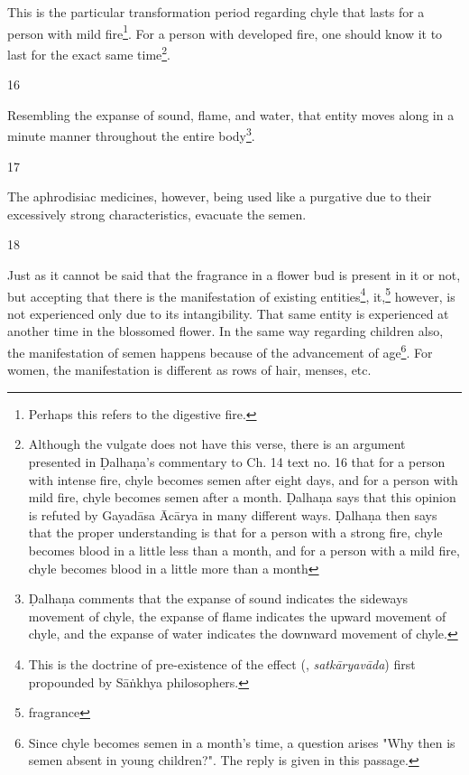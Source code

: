 \begin{translation}
\begin{sloka}
This is the particular transformation period regarding chyle that lasts for a person with mild fire\footnote{Perhaps this refers to the digestive fire.}. For a person with developed fire, one should know it to last for the exact same time\footnote{Although the vulgate does not have this verse, there is an argument presented in Ḍalhaṇa's commentary \citep[63]{vulgate} to Ch. 14 text no. 16 that for a person with intense fire, chyle becomes semen after eight days, and for a person with mild fire, chyle becomes semen after a month. Ḍalhaṇa says that this opinion is refuted by Gayadāsa Ācārya in many different ways. Ḍalhaṇa then says that the proper understanding is that for a person with a strong fire, chyle becomes blood in a little less than a month, and for a person with a mild fire, chyle becomes blood in a little more than a month}.



\end{sloka}

\item[16]

Resembling the expanse of sound, flame, and water, that entity moves along in a minute manner throughout the  entire body\footnote{Ḍalhaṇa comments \citep[63]{vulgate} that the expanse of sound indicates the sideways movement of chyle, the expanse of flame indicates the upward movement of chyle, and the expanse of water indicates the downward movement of chyle.}.

\item[17]

The aphrodisiac medicines, however, being used like a purgative due to their excessively strong characteristics, evacuate the semen.      

\item[18]

Just as it cannot be said that the fragrance in a flower bud is present in it or not, but 
accepting that there is the manifestation of existing entities\footnote{This is the 
doctrine of pre-existence of the effect (, \textit{satkāryavāda}) 
first propounded by Sāṅkhya philosophers.}, it,\footnote{fragrance} however, is not 
experienced only due to its intangibility. That same entity is experienced at another 
time in the blossomed flower. In the same way regarding children also, the 
manifestation of semen happens because of the advancement of 
age\footnote{Since chyle becomes semen in a month's time, a question arises "Why 
then is semen absent in young children?". The reply is given in this passage.}. For 
women, the manifestation is different as rows of hair, menses, etc. 


\end{translation}
